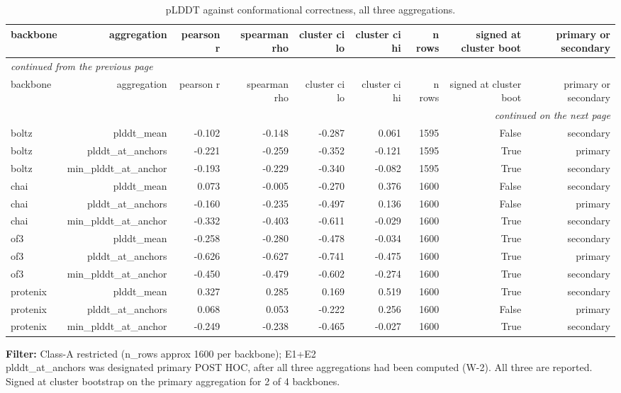 \begingroup\footnotesize\setlength{\tabcolsep}{3pt}
\begin{longtable}{lrrrrrrrr}
\caption{pLDDT against conformational correctness, all three aggregations.}
\label{tab:t4_confidence}\\
\toprule
backbone & aggregation & pearson r & spearman rho & cluster ci lo & cluster ci hi & n rows & signed at cluster boot & primary or secondary \\
\midrule
\endfirsthead
\multicolumn{9}{l}{\scriptsize\itshape continued from the previous page}\\
\toprule
backbone & aggregation & pearson r & spearman rho & cluster ci lo & cluster ci hi & n rows & signed at cluster boot & primary or secondary \\
\midrule
\endhead
\midrule
\multicolumn{9}{r}{\scriptsize\itshape continued on the next page}\\
\endfoot
\bottomrule
\endlastfoot
boltz & plddt\_mean & -0.102 & -0.148 & -0.287 & 0.061 & 1595 & False & secondary \\
boltz & plddt\_at\_anchors & -0.221 & -0.259 & -0.352 & -0.121 & 1595 & True & primary \\
boltz & min\_plddt\_at\_anchor & -0.193 & -0.229 & -0.340 & -0.082 & 1595 & True & secondary \\
chai & plddt\_mean & 0.073 & -0.005 & -0.270 & 0.376 & 1600 & False & secondary \\
chai & plddt\_at\_anchors & -0.160 & -0.235 & -0.497 & 0.136 & 1600 & False & primary \\
chai & min\_plddt\_at\_anchor & -0.332 & -0.403 & -0.611 & -0.029 & 1600 & True & secondary \\
of3 & plddt\_mean & -0.258 & -0.280 & -0.478 & -0.034 & 1600 & True & secondary \\
of3 & plddt\_at\_anchors & -0.626 & -0.627 & -0.741 & -0.475 & 1600 & True & primary \\
of3 & min\_plddt\_at\_anchor & -0.450 & -0.479 & -0.602 & -0.274 & 1600 & True & secondary \\
protenix & plddt\_mean & 0.327 & 0.285 & 0.169 & 0.519 & 1600 & True & secondary \\
protenix & plddt\_at\_anchors & 0.068 & 0.053 & -0.222 & 0.256 & 1600 & False & primary \\
protenix & min\_plddt\_at\_anchor & -0.249 & -0.238 & -0.465 & -0.027 & 1600 & True & secondary \\
\end{longtable}
\begin{flushleft}\scriptsize
\textbf{Filter:} Class-A restricted (n\_rows approx 1600 per backbone); E1+E2
 \\ plddt\_at\_anchors was designated primary POST HOC, after all three aggregations had been computed (W-2). All three are reported. Signed at cluster bootstrap on the primary aggregation for 2 of 4 backbones.
\end{flushleft}
\endgroup
